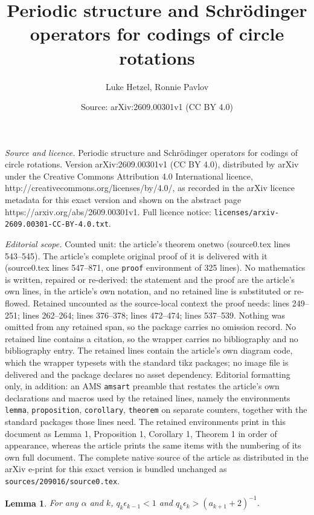 \documentclass[10pt,a4paper]{amsart}
\title{Periodic structure and Schr\"{o}dinger operators for codings of circle rotations}
\author{Luke Hetzel, Ronnie Pavlov}
\date{Source: arXiv:2609.00301v1 (CC BY 4.0)}
\newtheorem{lemma}{Lemma}
\begin{document}
\maketitle

\noindent\emph{Source and licence.} Periodic structure and Schr\"{o}dinger operators for codings of circle rotations. Version arXiv:2609.00301v1 (CC BY 4.0), distributed by arXiv under the Creative Commons Attribution 4.0 International licence, http://creativecommons.org/licenses/by/4.0/, as recorded in the arXiv licence metadata for this exact version and shown on the abstract page https://arxiv.org/abs/2609.00301v1. Full licence notice: \texttt{licenses/arxiv-2609.00301-CC-BY-4.0.txt}.\par\smallskip

\noindent\textit{Editorial scope.} Counted unit: the article's theorem onetwo (source0.tex lines 543--545). The article's complete original proof of it is delivered with it (source0.tex lines 547--871, one \texttt{proof} environment of 325 lines). No mathematics is written, repaired or re-derived: the statement and the proof are the article's own lines, in the article's own notation, and no retained line is substituted or re-flowed.  Retained uncounted as the source-local context the proof needs: lines 249--251; lines 262--264; lines 376--378; lines 472--474; lines 537--539.  Nothing was omitted from any retained span, so the package carries no omission record.  No retained line contains a citation, so the wrapper carries no bibliography and no bibliography entry.  The retained lines contain the article's own diagram code, which the wrapper typesets with the standard tikz packages; no image file is delivered and the package declares no asset dependency.  Editorial formatting only, in addition: an AMS \texttt{amsart} preamble that restates the article's own declarations and macros used by the retained lines, namely the environments \texttt{lemma}, \texttt{proposition}, \texttt{corollary}, \texttt{theorem} on separate counters, together with the standard packages those lines need.  The retained environments print in this document as Lemma 1, Proposition 1, Corollary 1, Theorem 1 in order of appearance, whereas the article prints the same items with the numbering of its own full document.  The complete native source of the article as distributed in the arXiv e-print for this exact version is bundled unchanged as \texttt{sources/209016/source0.tex}.
\begin{lemma}\label{qeps}
For any $\alpha$ and $k$, $q_k \epsilon_{k-1} < 1$ and $q_k \epsilon_k > (a_{k+1} + 2)^{-1}$. %
\end{lemma}
\end{document}
